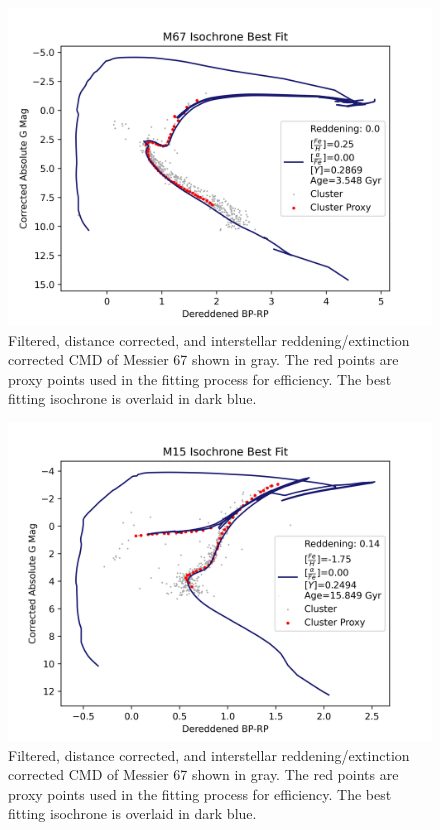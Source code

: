 \documentclass[onecolumn,table,xcdraw,super]{aastex631}
\begin{document}
\begin{figure}[]
    \centering
      \includegraphics[width=4.75in]{figures/M67_CMD_Iso_BestFit.png}
    \caption{Filtered, distance corrected, and interstellar reddening/extinction corrected CMD of Messier 67 shown in gray. The red points are proxy points used in the fitting process for efficiency. The best fitting isochrone is overlaid in dark blue.}
    \label{fig:M67_iso}
\end{figure}

\begin{figure}[]
    \centering
      \includegraphics[width=4.75in]{figures/M15_CMD_Iso_BestFit.png}
    \caption{Filtered, distance corrected, and interstellar reddening/extinction corrected CMD of Messier 67 shown in gray. The red points are proxy points used in the fitting process for efficiency. The best fitting isochrone is overlaid in dark blue.}
    \label{fig:M15_iso}
\end{figure}
\end{document}
